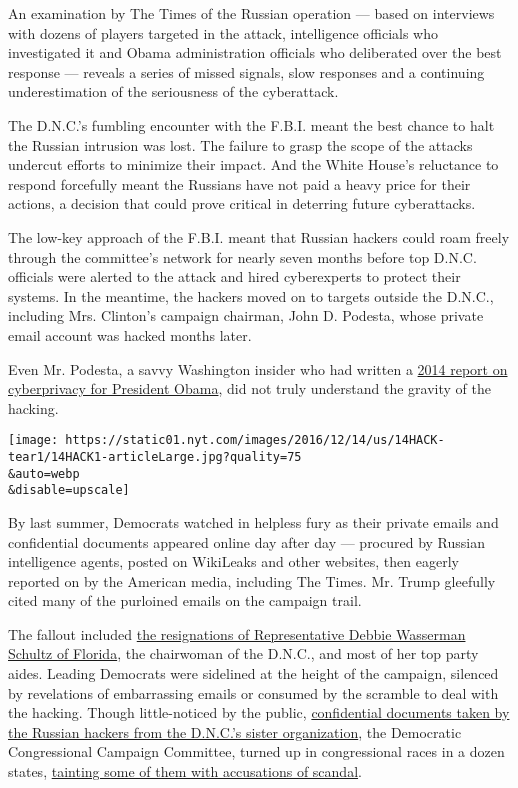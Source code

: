 An examination by The Times of the Russian operation --- based on
interviews with dozens of players targeted in the attack, intelligence
officials who investigated it and Obama administration officials who
deliberated over the best response --- reveals a series of missed
signals, slow responses and a continuing underestimation of the
seriousness of the cyberattack.

The D.N.C.'s fumbling encounter with the F.B.I. meant the best chance to
halt the Russian intrusion was lost. The failure to grasp the scope of
the attacks undercut efforts to minimize their impact. And the White
House's reluctance to respond forcefully meant the Russians have not
paid a heavy price for their actions, a decision that could prove
critical in deterring future cyberattacks.

The low-key approach of the F.B.I. meant that Russian hackers could roam
freely through the committee's network for nearly seven months before
top D.N.C. officials were alerted to the attack and hired cyberexperts
to protect their systems. In the meantime, the hackers moved on to
targets outside the D.N.C., including Mrs. Clinton's campaign chairman,
John D. Podesta, whose private email account was hacked months later.

Even Mr. Podesta, a savvy Washington insider who had written a
\href{https://www.whitehouse.gov/sites/default/files/docs/big_data_privacy_report_may_1_2014.pdf}{2014
report on cyberprivacy for President Obama}, did not truly understand
the gravity of the hacking.

\texttt{[image: https://static01.nyt.com/images/2016/12/14/us/14HACK-tear1/14HACK1-articleLarge.jpg?quality=75\\\&auto=webp\\\&disable=upscale]}

By last summer, Democrats watched in helpless fury as their private
emails and confidential documents appeared online day after day ---
procured by Russian intelligence agents, posted on WikiLeaks and other
websites, then eagerly reported on by the American media, including The
Times. Mr. Trump gleefully cited many of the purloined emails on the
campaign trail.

The fallout included
\href{https://www.nytimes.com/2016/07/25/us/politics/debbie-wasserman-schultz-dnc-wikileaks-emails.html}{the
resignations of Representative Debbie Wasserman Schultz of Florida}, the
chairwoman of the D.N.C., and most of her top party aides. Leading
Democrats were sidelined at the height of the campaign, silenced by
revelations of embarrassing emails or consumed by the scramble to deal
with the hacking. Though little-noticed by the public,
\href{https://guccifer2.wordpress.com/2016/08/15/dccc-internal-docs-on-primaries-in-florida/}{confidential
documents taken by the Russian hackers from the D.N.C.'s sister
organization}, the Democratic Congressional Campaign Committee, turned
up in congressional races in a dozen states,
\href{http://www.nytimes.com/2016/12/13/us/politics/house-democrats-hacking-dccc.html}{tainting
some of them with accusations of scandal}.

